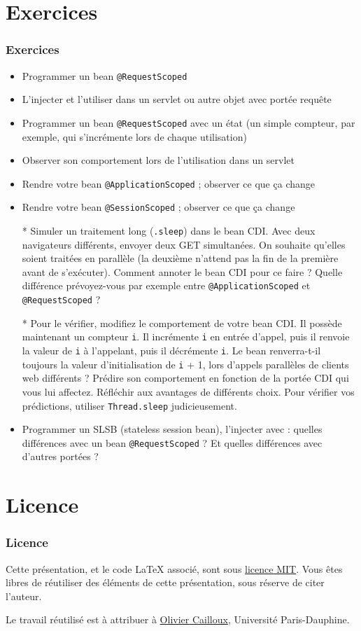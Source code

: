 \documentclass[english, french]{beamer}
\begin{document}
\section{Exercices}
\begin{frame}[allowframebreaks]
	\frametitle{Exercices}
	\begin{itemize}
		\item Programmer un bean \texttt{@RequestScoped}
		\item L’injecter et l’utiliser dans un servlet {\tiny ou autre objet avec portée requête}
		\item Programmer un bean \texttt{@RequestScoped} avec un état (un simple compteur, par exemple, qui s’incrémente lors de chaque utilisation)
		\item Observer son comportement lors de l’utilisation dans un servlet
		\item Rendre votre bean \texttt{@ApplicationScoped} ; observer ce que ça change
		\item Rendre votre bean \texttt{@SessionScoped} ; observer ce que ça change
		\item[*] Simuler un traitement long (\texttt{.sleep}) dans le bean CDI. Avec deux navigateurs différents, envoyer deux GET simultanées. On souhaite qu’elles soient traitées en parallèle (la deuxième n’attend pas la fin de la première avant de s’exécuter). Comment annoter le bean CDI pour ce faire ? Quelle différence prévoyez-vous par exemple entre \texttt{@ApplicationScoped} et \texttt{@RequestScoped} ?
		\item[*] Pour le vérifier, modifiez le comportement de votre bean CDI. Il possède maintenant un compteur \texttt{i}. Il incrémente \texttt{i} en entrée d’appel, puis il renvoie la valeur de \texttt{i} à l’appelant, puis il décrémente \texttt{i}. Le bean renverra-t-il toujours la valeur d’initialisation de \texttt{i} + 1, lors d’appels parallèles de clients web différents ? Prédire son comportement en fonction de la portée CDI qui vous lui affectez. Réfléchir aux avantages de différents choix. Pour vérifier vos prédictions, utiliser \texttt{Thread.sleep} judicieusement.
		\item Programmer un SLSB (stateless session bean), l’injecter avec  : quelles différences avec un bean \texttt{@RequestScoped} ? Et quelles différences avec d’autres portées ?
	\end{itemize}
\end{frame}

\section{Licence}
\begin{frame}
	\frametitle{Licence}
	Cette présentation, et le code LaTeX associé, sont sous \href{https://opensource.org/licenses/MIT}{licence MIT}. Vous êtes libres de réutiliser des éléments de cette présentation, sous réserve de citer l’auteur.
	
	Le travail réutilisé est à attribuer à \href{https://www.lamsade.dauphine.fr/~ocailloux/}{Olivier Cailloux}, Université Paris-Dauphine.
\end{frame}
\end{document}
